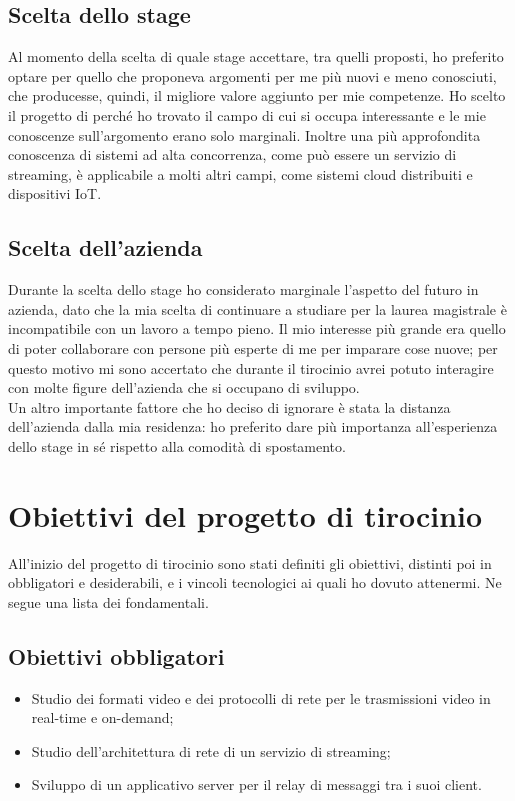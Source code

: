    \subsection{Scelta dello stage}
   Al momento della scelta di quale stage accettare, tra quelli proposti, ho preferito optare per quello che proponeva argomenti per me più nuovi e meno conosciuti, che producesse, quindi, il migliore valore aggiunto per mie competenze.
   Ho scelto il progetto di \nomeAzienda{} perché ho trovato il campo di cui si occupa interessante e le mie conoscenze sull'argomento erano solo marginali. Inoltre una più approfondita conoscenza di sistemi ad alta concorrenza, come può essere un servizio di streaming, è applicabile a molti altri campi, come sistemi cloud distribuiti e dispositivi IoT.

   \subsection{Scelta dell'azienda}
   Durante la scelta dello stage ho considerato marginale l'aspetto del futuro in azienda, dato che la mia scelta di continuare a studiare per la laurea magistrale è incompatibile con un lavoro a tempo pieno. Il mio interesse più grande era quello di poter collaborare con persone più esperte di me per imparare cose nuove; per questo motivo mi sono accertato che durante il tirocinio avrei potuto interagire con molte figure dell'azienda che si occupano di sviluppo.
   \\
   Un altro importante fattore che ho deciso di ignorare è stata la distanza dell'azienda dalla mia residenza: ho preferito dare più importanza all'esperienza dello stage in sé rispetto alla comodità di spostamento.

\section{Obiettivi del progetto di tirocinio}
All'inizio del progetto di tirocinio sono stati definiti gli obiettivi, distinti poi in obbligatori e desiderabili, e i vincoli tecnologici ai quali ho dovuto attenermi. Ne segue una lista dei fondamentali.

   \subsection{Obiettivi obbligatori}
   \begin{itemize}
      \item{Studio dei formati video e dei protocolli di rete per le trasmissioni video in real-time e on-demand;}
      \item{Studio dell'architettura di rete di un servizio di streaming;}
      \item{Sviluppo di un applicativo server per il relay di messaggi tra i suoi client.}
   \end{itemize}


